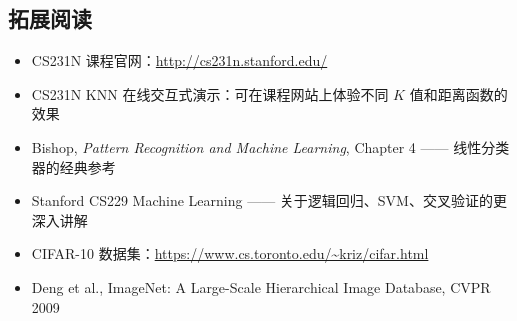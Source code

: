 \documentclass[a4paper]{article}
\begin{document}
\subsection{拓展阅读}

\begin{itemize}
    \item CS231N 课程官网：\url{http://cs231n.stanford.edu/}
    \item CS231N KNN 在线交互式演示：可在课程网站上体验不同 $K$ 值和距离函数的效果
    \item Bishop, \textit{Pattern Recognition and Machine Learning}, Chapter 4 —— 线性分类器的经典参考
    \item Stanford CS229 Machine Learning —— 关于逻辑回归、SVM、交叉验证的更深入讲解
    \item CIFAR-10 数据集：\url{https://www.cs.toronto.edu/~kriz/cifar.html}
    \item Deng et al., ImageNet: A Large-Scale Hierarchical Image Database, CVPR 2009
\end{itemize}
\end{document}
